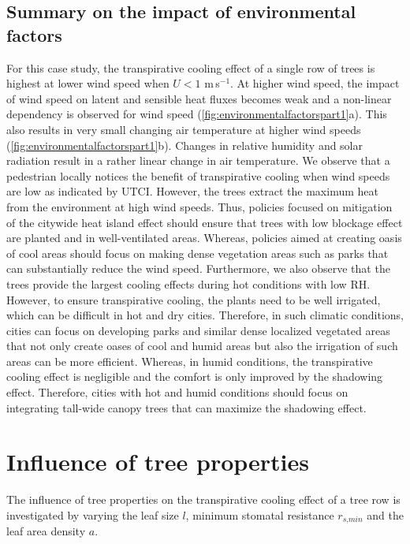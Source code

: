 \subsection{Summary on the impact of environmental factors}

For this case study, the transpirative cooling effect of a single row of trees is highest at lower wind speed when $U < 1$ m\,s$^{-1}$. At higher wind speed, the impact of wind speed on latent and sensible heat fluxes becomes weak and a non-linear dependency is observed for wind speed (\cref{fig:environmentalfactorspart1}a). This also results in very small changing air temperature at higher wind speeds (\cref{fig:environmentalfactorspart1}b). Changes in relative humidity and solar radiation result in a rather linear change in air temperature. We observe that a pedestrian locally notices the benefit of transpirative cooling when wind speeds are low as indicated by UTCI. However, the trees extract the maximum heat from the environment at high wind speeds. Thus, policies focused on mitigation of the citywide heat island effect should ensure that trees with low blockage effect are planted and in well-ventilated areas. Whereas, policies aimed at creating oasis of cool areas should focus on making dense vegetation areas such as parks that can substantially reduce the wind speed. Furthermore, we also observe that the trees provide the largest cooling effects during hot conditions with low RH. However, to ensure transpirative cooling, the plants need to be well irrigated, which can be difficult in hot and dry cities. Therefore, in such climatic conditions, cities can focus on developing parks and similar dense localized vegetated areas that not only create oases of cool and humid areas but also the irrigation of such areas can be more efficient. Whereas, in humid conditions, the transpirative cooling effect is negligible and the comfort is only improved by the shadowing effect. Therefore, cities with hot and humid conditions should focus on integrating tall-wide canopy trees that can maximize the shadowing effect. 

\section{Influence of tree properties}

The influence of tree properties on the transpirative cooling effect of a tree row is investigated by varying the leaf size $l$, minimum stomatal resistance $r_{\textit{s,min}}$ and the leaf area density $a$. 

